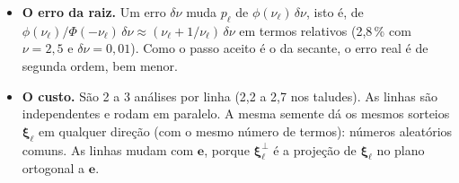 \documentclass[11pt,a4paper]{article}
\newcommand{\xib}{\bm\xi}
\begin{document}
\begin{itemize}
  \item \textbf{O erro da raiz.} Um erro $\delta\nu$ muda $p_\ell$ de $\phi(\nu_\ell)\,\delta\nu$, isto é, de
    $\phi(\nu_\ell)/\Phi(-\nu_\ell)\,\delta\nu \approx (\nu_\ell + 1/\nu_\ell)\,\delta\nu$ em termos relativos (2,8\,\% com
    $\nu = 2{,}5$ e $\delta\nu = 0{,}01$). Como o passo aceito é o
    da secante, o erro real é de segunda ordem, bem menor.
  \item \textbf{O custo.} São 2 a 3 análises por linha (2,2 a 2,7 nos taludes). As linhas são independentes e rodam em
    paralelo. A mesma semente dá os mesmos sorteios $\xib_\ell$ em qualquer direção (com o mesmo número de termos):
    números aleatórios comuns. As linhas mudam com $\bm e$, porque $\xib^\perp_\ell$ é a projeção de $\xib_\ell$ no plano
    ortogonal a $\bm e$.
\end{itemize}
\end{document}
